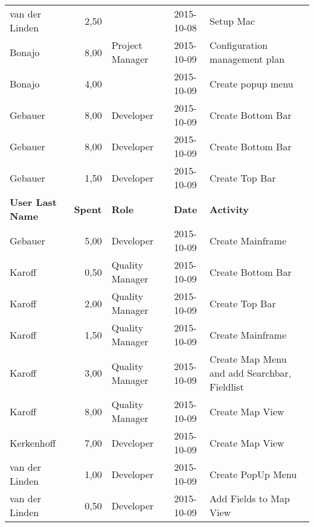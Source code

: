 \begin{longtable}{ l r p{2cm} c p{4cm}}
		van der Linden          & 2,50           &                 & 2015-10-08    & Setup Mac                                       \\
		Bonajo                  & 8,00           & Project Manager & 2015-10-09    & Configuration management plan                   \\
		Bonajo                  & 4,00           &                 & 2015-10-09    & Create popup menu                               \\
		Gebauer                 & 8,00           & Developer       & 2015-10-09    & Create Bottom Bar                               \\
		Gebauer                 & 8,00           & Developer       & 2015-10-09    & Create Bottom Bar                               \\
		Gebauer                 & 1,50           & Developer       & 2015-10-09    & Create Top Bar                                  \\
		\textbf{User Last Name} & \textbf{Spent} & \textbf{Role} & \textbf{Date} & \textbf{Activity} \\
		\hline
		Gebauer                 & 5,00           & Developer       & 2015-10-09    & Create Mainframe                                \\
		Karoff                  & 0,50           & Quality Manager & 2015-10-09    & Create Bottom Bar                               \\
		Karoff                  & 2,00           & Quality Manager & 2015-10-09    & Create Top Bar                                  \\
		Karoff                  & 1,50           & Quality Manager & 2015-10-09    & Create Mainframe                                \\
		Karoff                  & 3,00           & Quality Manager & 2015-10-09    & Create Map Menu and add Searchbar, Fieldlist    \\
		Karoff                  & 8,00           & Quality Manager & 2015-10-09    & Create Map View                                 \\
		Kerkenhoff              & 7,00           & Developer       & 2015-10-09    & Create Map View                                 \\
		van der Linden          & 1,00           & Developer       & 2015-10-09    & Create PopUp Menu                               \\
		van der Linden          & 0,50           & Developer       & 2015-10-09    & Add Fields to Map View                          \\

\end{longtable}
